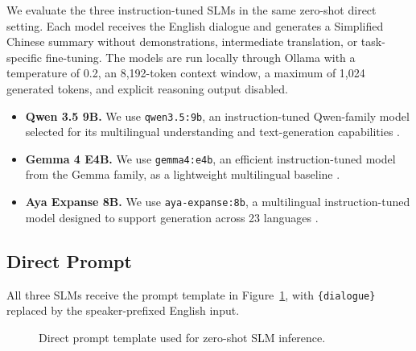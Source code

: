 \documentclass[11pt]{article}
\begin{document}
We evaluate the three instruction-tuned SLMs in the same zero-shot direct setting. Each model receives the English dialogue and generates a Simplified Chinese summary without demonstrations, intermediate translation, or task-specific fine-tuning. The models are run locally through Ollama with a temperature of 0.2, an 8,192-token context window, a maximum of 1,024 generated tokens, and explicit reasoning output disabled.

\begin{itemize}
    \item \textbf{Qwen 3.5 9B.} We use \texttt{qwen3.5:9b}, an instruction-tuned Qwen-family model selected for its multilingual understanding and text-generation capabilities \citep{qwen3.5}.

    \item \textbf{Gemma 4 E4B.} We use \texttt{gemma4:e4b}, an efficient instruction-tuned model from the Gemma family, as a lightweight multilingual baseline \citep{gemma4_2026}.

    \item \textbf{Aya Expanse 8B.} We use \texttt{aya-expanse:8b}, a multilingual instruction-tuned model designed to support generation across 23 languages \citep{dang2024ayaexpansecombiningresearch}.
\end{itemize}

\subsection{Direct Prompt}
\label{sec:appendix-direct-prompt}

All three SLMs receive the prompt template in Figure~\ref{fig:direct-prompt}, with \texttt{\{dialogue\}} replaced by the speaker-prefixed English input.

\begin{figure}[H]
\centering
{}
\caption{Direct prompt template used for zero-shot SLM inference.}
\label{fig:direct-prompt}
\end{figure}
\end{document}
